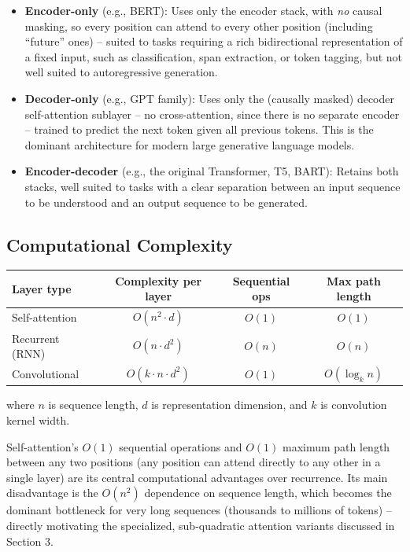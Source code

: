 \documentclass[11pt]{article}
\begin{document}
\begin{itemize}[leftmargin=1.5em]
    \item \textbf{Encoder-only} (e.g., BERT): Uses only the encoder stack, with \emph{no} causal masking, so every position can attend to every other position (including ``future'' ones) -- suited to tasks requiring a rich bidirectional representation of a fixed input, such as classification, span extraction, or token tagging, but not well suited to autoregressive generation.
    \item \textbf{Decoder-only} (e.g., GPT family): Uses only the (causally masked) decoder self-attention sublayer -- no cross-attention, since there is no separate encoder -- trained to predict the next token given all previous tokens. This is the dominant architecture for modern large generative language models.
    \item \textbf{Encoder-decoder} (e.g., the original Transformer, T5, BART): Retains both stacks, well suited to tasks with a clear separation between an input sequence to be understood and an output sequence to be generated.
\end{itemize}

\subsection*{Computational Complexity}

\begin{center}
\renewcommand{\arraystretch}{1.3}
\begin{tabular}{|l|c|c|c|}
\hline
\textbf{Layer type} & \textbf{Complexity per layer} & \textbf{Sequential ops} & \textbf{Max path length} \\
\hline
Self-attention & $O(n^2 \cdot d)$ & $O(1)$ & $O(1)$ \\
Recurrent (RNN) & $O(n \cdot d^2)$ & $O(n)$ & $O(n)$ \\
Convolutional & $O(k \cdot n \cdot d^2)$ & $O(1)$ & $O(\log_k n)$ \\
\hline
\end{tabular}
\end{center}
where $n$ is sequence length, $d$ is representation dimension, and $k$ is convolution kernel width.

\begin{keyidea}
Self-attention's $O(1)$ sequential operations and $O(1)$ maximum path length between any two positions (any position can attend directly to any other in a single layer) are its central computational advantages over recurrence. Its main disadvantage is the $O(n^2)$ dependence on sequence length, which becomes the dominant bottleneck for very long sequences (thousands to millions of tokens) -- directly motivating the specialized, sub-quadratic attention variants discussed in Section 3.
\end{keyidea}
\end{document}
